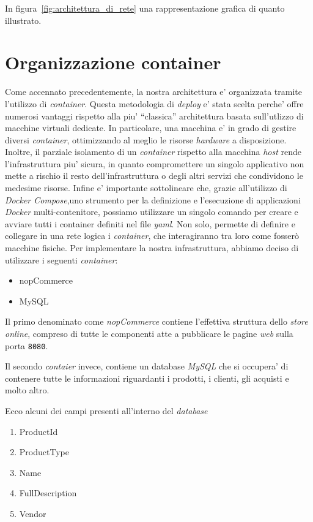 \documentclass[a4paper]{report}
\newcommand{\quotes}[1]{``#1''}
\begin{document}
		In figura~\ref{fig:architettura_di_rete} una rappresentazione grafica di quanto illustrato.

	\section{Organizzazione container}\label{organizzazione_container}
		Come accennato precedentemente, la nostra architettura e' organizzata tramite l'utilizzo di \emph{container}.
		Questa metodologia di  \emph{deploy} e' stata scelta perche' offre numerosi vantaggi rispetto alla piu'
		\quotes{classica} architettura basata sull'utlizzo di macchine virtuali dedicate. In particolare, una macchina
		e' in grado di gestire diversi \emph{container}, ottimizzando al meglio le risorse \emph{hardware} a
		disposizione. Inoltre, il parziale isolamento di un \emph{container} rispetto alla macchina \emph{host} rende
		l'infrastruttura piu' sicura, in quanto compromettere un singolo applicativo non mette a rischio il resto
		dell'infrastruttura o degli altri servizi che condividono le medesime risorse.  Infine e' importante
		sottolineare che, grazie all'utilizzo di \emph{Docker Compose},uno strumento per la definizione e l'esecuzione
		di applicazioni \emph{Docker} multi-contenitore, possiamo utilizzare un singolo comando per creare e avviare
		tutti i container definiti nel file \emph{yaml}. Non solo, permette di definire e collegare in una rete logica i
		\emph{container}, che interagiranno tra loro come fosserò macchine fisiche.  Per implementare la nostra
		infrastruttura, abbiamo deciso di utilizzare i seguenti \emph{container}:
		\begin{itemize}
			\item nopCommerce
			\item MySQL
		\end{itemize}
		Il primo denominato come \emph{nopCommerce} contiene l'effettiva struttura dello \emph{store online}, compreso
		di tutte le componenti atte a pubblicare le pagine \emph{web} sulla porta \texttt{8080}.
		
		Il secondo \emph{contaier} invece, contiene un database \emph{MySQL} che si occupera' di contenere tutte le
		informazioni riguardanti i prodotti, i clienti, gli acquisti e molto altro.
		
		Ecco alcuni dei campi presenti all'interno del \emph{database}
		\begin{enumerate}
			\item ProductId
			\item ProductType
			\item Name
			\item FullDescription
			\item Vendor
		\end{enumerate}
\end{document}
